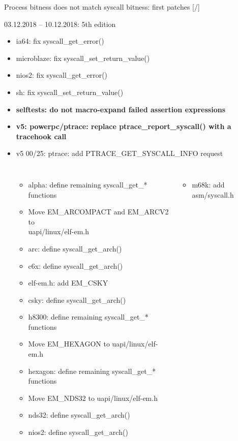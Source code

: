 \documentclass[unicode,aspectratio=169]{beamer}
\begin{document}
\begin{frame}{Process bitness does not match syscall bitness: first patches \hfill [\insertframenumber/\inserttotalframenumber]}
\scriptsize
\begin{block}{03.12.2018 -- 10.12.2018: 5th edition}
\begin{itemize}
	\setlength{\itemsep}{0pt}
	\item ia64: fix syscall\_get\_error()
	\item microblaze: fix syscall\_set\_return\_value()
	\item nios2: fix syscall\_get\_error()
	\item sh: fix syscall\_set\_return\_value()
	\item {\bf selftests: do not macro-expand failed assertion expressions}
	\item {\bf v5: powerpc/ptrace: replace ptrace\_report\_syscall() with a tracehook call}
	\item v5 00/25: ptrace: add PTRACE\_GET\_SYSCALL\_INFO request
	\setlength{\itemsep}{0pt}
	\begin{columns}
		\column{7cm}
			\begin{itemize}
				\tiny
				\setlength{\itemsep}{0pt}
				\item alpha: define remaining syscall\_get\_* functions
				\item Move EM\_ARCOMPACT and EM\_ARCV2 to \\ uapi/linux/elf-em.h
				\item arc: define syscall\_get\_arch()
				\item c6x: define syscall\_get\_arch()
				\item elf-em.h: add EM\_CSKY
				\item csky: define syscall\_get\_arch()
				\item h8300: define remaining syscall\_get\_* functions
				\item Move EM\_HEXAGON to uapi/linux/elf-em.h
				\item hexagon: define remaining syscall\_get\_* functions
				\item Move EM\_NDS32 to uapi/linux/elf-em.h
				\item nds32: define syscall\_get\_arch()
				\item nios2: define syscall\_get\_arch()
			\end{itemize}
		\column{7cm}
			\begin{itemize}
				\tiny
				\setlength{\itemsep}{0pt}
				\item m68k: add asm/syscall.h

\end{itemize}
\end{columns}
\end{itemize}
\end{block}
\end{frame}
\end{document}
